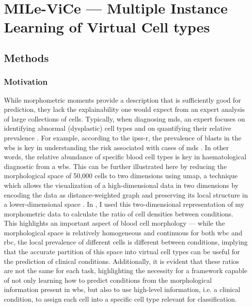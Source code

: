 \section{MILe-ViCe --- Multiple Instance Learning of Virtual Cell types}

\subsection{Methods}

\subsubsection{Motivation}

While morphometric moments provide a description that is sufficiently good for prediction, they lack the explainability one would expect from an expert analysis of large collections of cells. Typically, when diagnosing \ac{mds}, an expert focuses on identifying abnormal (dysplastic) cell types and on quantifying their relative prevalence \cite{Valent2017-uh}. For example, according to the \ac{ipss-r}, the prevalence of blasts in the \ac{wbs} is key in understanding the risk associated with cases of \ac{mds} \cite{Greenberg2012-en}. In other words, the relative abundance of specific blood cell types is key in haematological diagnostic from a \ac{wbs}. This can be further illustrated here by reducing the morphological space of 50,000 cells to two dimensions using \ac{umap}, a technique which allows the visualization of a high-dimensional data in two dimensions by encoding the data as distance-weighted graph and preserving its local structure in a lower-dimensional space \cite{umap-ref}. In , I used this two-dimensional representation of my morphometric data to calculate the ratio of cell densities between conditions. This highlights an important aspect of blood cell morphology --- while the morphological space is relatively homogeneous and continuous for both \ac{wbc} and \ac{rbc}, the local prevalence of different cells is different between conditions, implying that the accurate partition of this space into virtual cell types can be useful for the prediction of clinical conditions. Additionally, it is evident that these ratios are not the same for each task, highlighting the necessity for a framework capable of not only learning how to predict conditions from the morphological information present in \ac{wbs}, but also to use high-level information, i.e. a clinical condition, to assign each cell into a specific cell type relevant for classification.

